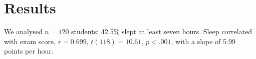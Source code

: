 \documentclass{article}
\newcommand{\sv}[2]{#2}  %
\begin{document}
\section*{Results}
We analysed $n = \sv{n}{120}$ students; \sv{share_over_7h}{42.5\%} slept at least seven hours.
Sleep correlated with exam score, $r = \sv{r_sleep_score}{0.699}$,
$t(\sv{df}{118}) = \sv{t_stat}{10.61}$, $p < .001$,
with a slope of \sv{slope}{5.99} points per hour.
\end{document}
